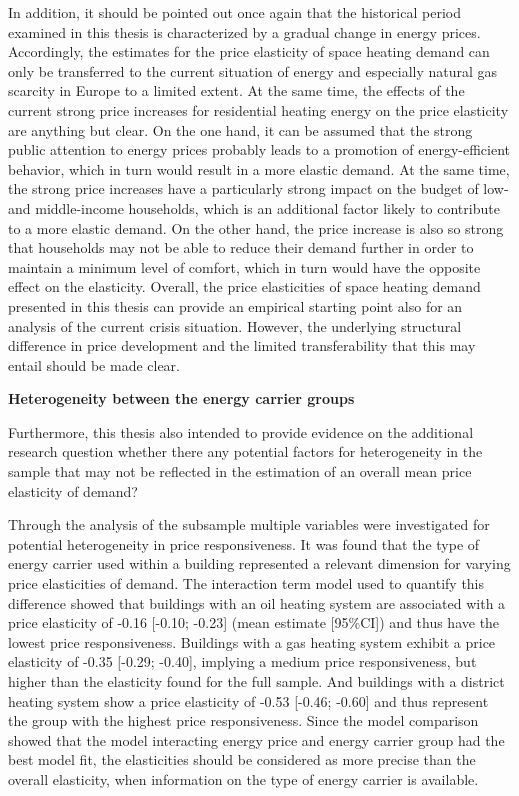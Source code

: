 \documentclass[12pt,twoside]{reedthesis}
\begin{document}
In addition, it should be pointed out once again that the historical period examined in this thesis is characterized by a gradual change in energy prices. Accordingly, the estimates for the price elasticity of space heating demand can only be transferred to the current situation of energy and especially natural gas scarcity in Europe to a limited extent. At the same time, the effects of the current strong price increases for residential heating energy on the price elasticity are anything but clear. On the one hand, it can be assumed that the strong public attention to energy prices probably leads to a promotion of energy-efficient behavior, which in turn would result in a more elastic demand. At the same time, the strong price increases have a particularly strong impact on the budget of low- and middle-income households, which is an additional factor likely to contribute to a more elastic demand. On the other hand, the price increase is also so strong that households may not be able to reduce their demand further in order to maintain a minimum level of comfort, which in turn would have the opposite effect on the elasticity. Overall, the price elasticities of space heating demand presented in this thesis can provide an empirical starting point also for an analysis of the current crisis situation. However, the underlying structural difference in price development and the limited transferability that this may entail should be made clear.

\textbf{Heterogeneity between the energy carrier groups}

Furthermore, this thesis also intended to provide evidence on the additional research question whether there any potential factors for heterogeneity in the sample that may not be reflected in the estimation of an overall mean price elasticity of demand?

Through the analysis of the subsample multiple variables were investigated for potential heterogeneity in price responsiveness. It was found that the type of energy carrier used within a building represented a relevant dimension for varying price elasticities of demand. The interaction term model used to quantify this difference showed that buildings with an oil heating system are associated with a price elasticity of -0.16 {[}-0.10; -0.23{]} (mean estimate {[}95\%CI{]}) and thus have the lowest price responsiveness. Buildings with a gas heating system exhibit a price elasticity of -0.35 {[}-0.29; -0.40{]}, implying a medium price responsiveness, but higher than the elasticity found for the full sample. And buildings with a district heating system show a price elasticity of -0.53 {[}-0.46; -0.60{]} and thus represent the group with the highest price responsiveness. Since the model comparison showed that the model interacting energy price and energy carrier group had the best model fit, the elasticities should be considered as more precise than the overall elasticity, when information on the type of energy carrier is available.
\end{document}
